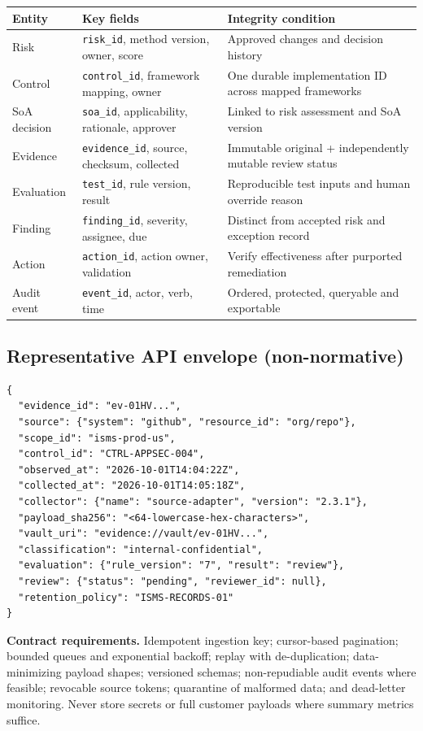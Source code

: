 \documentclass[10pt,letterpaper]{article}
\begin{document}
\begin{tabularx}{\linewidth}{@{}L{1.23in}L{1.65in}Y@{}}
\toprule
\textbf{Entity} & \textbf{Key fields} & \textbf{Integrity condition}\\\midrule
Risk & \texttt{risk\_id}, method version, owner, score & Approved changes and decision history\\
Control & \texttt{control\_id}, framework mapping, owner & One durable implementation ID across mapped frameworks\\
SoA decision & \texttt{soa\_id}, applicability, rationale, approver & Linked to risk assessment and SoA version\\
Evidence & \texttt{evidence\_id}, source, checksum, collected & Immutable original + independently mutable review status\\
Evaluation & \texttt{test\_id}, rule version, result & Reproducible test inputs and human override reason\\
Finding & \texttt{finding\_id}, severity, assignee, due & Distinct from accepted risk and exception record\\
Action & \texttt{action\_id}, action owner, validation & Verify effectiveness after purported remediation\\
Audit event & \texttt{event\_id}, actor, verb, time & Ordered, protected, queryable and exportable\\
\bottomrule
\end{tabularx}

\subsection{Representative API envelope (non-normative)}
\begin{lstlisting}[language={},caption={Illustrative normalized evidence record; not an ISO-prescribed schema.}]
{
  "evidence_id": "ev-01HV...",
  "source": {"system": "github", "resource_id": "org/repo"},
  "scope_id": "isms-prod-us",
  "control_id": "CTRL-APPSEC-004",
  "observed_at": "2026-10-01T14:04:22Z",
  "collected_at": "2026-10-01T14:05:18Z",
  "collector": {"name": "source-adapter", "version": "2.3.1"},
  "payload_sha256": "<64-lowercase-hex-characters>",
  "vault_uri": "evidence://vault/ev-01HV...",
  "classification": "internal-confidential",
  "evaluation": {"rule_version": "7", "result": "review"},
  "review": {"status": "pending", "reviewer_id": null},
  "retention_policy": "ISMS-RECORDS-01"
}
\end{lstlisting}
\textbf{Contract requirements.} Idempotent ingestion key; cursor-based pagination; bounded queues and exponential backoff; replay with de-duplication; data-minimizing payload shapes; versioned schemas; non-repudiable audit events where feasible; revocable source tokens; quarantine of malformed data; and dead-letter monitoring. Never store secrets or full customer payloads where summary metrics suffice.
\end{document}
